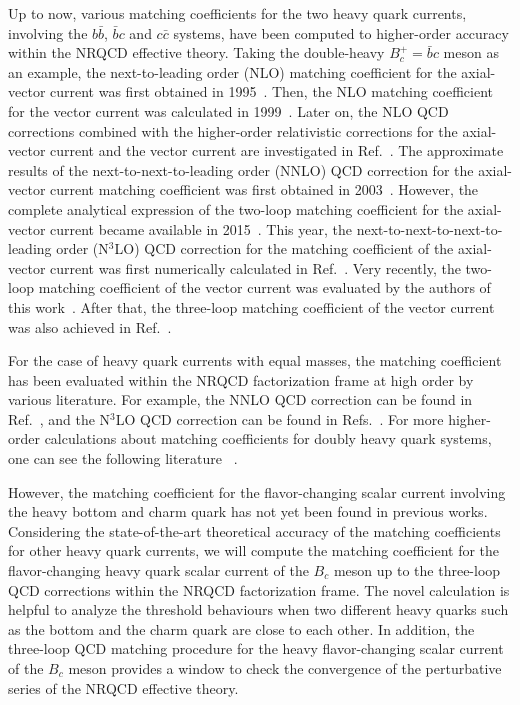 \documentclass[onecolumn,preprintnumbers,aps,superscriptaddress,nofootinbib,prd,notitlepage]{revtex4-1}
\begin{document}
Up to now, various  matching coefficients for the two heavy quark currents,  involving the $b\bar{b}$, $\bar{b}c $ and $c\bar{c}$ systems,  have been computed to higher-order accuracy within the NRQCD effective theory.
Taking the double-heavy $B_c^+ =\bar{b}c $ meson as an example, the next-to-leading order (NLO) matching coefficient for the axial-vector current was first obtained in 1995~\cite{Braaten:1995ej}.
Then, the NLO matching coefficient for the vector current was calculated in 1999~\cite{Hwang:1999fc}.
Later on,  the  NLO QCD corrections combined with the higher-order relativistic corrections for   the axial-vector current  and  the vector current are investigated in Ref.~\cite{Lee:2010ts}.
The approximate results of the next-to-next-to-leading order (NNLO) QCD correction for the   axial-vector current matching coefficient was first obtained in 2003~\cite{Onishchenko:2003ui}.
However, the complete analytical expression of the two-loop matching coefficient for the axial-vector current became available in 2015~\cite{Chen:2015csa}.
This year, the next-to-next-to-next-to-leading order (N$^3$LO) QCD correction for the matching coefficient of the axial-vector current  was first numerically calculated in Ref.~\cite{Feng:2022ruy}.
Very recently, the two-loop matching coefficient of the vector current  was evaluated by the authors of this work~\cite{Tao:2022qxa}.
After that, the three-loop matching coefficient of the vector current  was also achieved in Ref.~\cite{Sang:2022tnh}.

For the case of heavy quark currents with equal masses, the matching coefficient has been evaluated within the NRQCD factorization frame at high order by various literature.
For example, the NNLO QCD correction can be found in Ref.~\cite{Kniehl:2006qw}, and the N$^3$LO QCD correction can be found in Refs.~\cite{Piclum:2007an,Egner:2022jot}.
For more higher-order calculations about matching coefficients for doubly heavy quark systems, one can see the following literature ~\cite{Grozin:2007fh,Broadhurst:1994se,Marquard:2006qi,Egner:2021lxd,Beneke:1997jm,Marquard:2009bj,Marquard:2014pea,Kniehl:2002yv,Chen:2017soz,Piclum:2007an,Egner:2022jot,Feng:2022vvk,Tao:2022yur,Zhu:2017lqu,Zhu:2017lwi,Kiselev:1998wb,Lee:2018rgs,Bell:2010mg,Czarnecki:1997vz,Beneke:1997jm}.

However, the matching coefficient for the flavor-changing scalar current involving the heavy bottom and charm quark has not yet been found in previous works.
Considering the state-of-the-art theoretical accuracy of  the matching coefficients for other heavy quark currents, we will compute  the  matching coefficient for the flavor-changing heavy quark scalar current of the $B_c$ meson
up to the three-loop QCD corrections within the NRQCD factorization frame.
The novel calculation is helpful to analyze the threshold behaviours when two different heavy quarks such as the bottom and the charm quark are close to each other.
In addition, the three-loop QCD matching procedure for the heavy flavor-changing  scalar current of the $B_c$ meson provides a window to  check the convergence of the perturbative series of the NRQCD effective theory.
\end{document}
